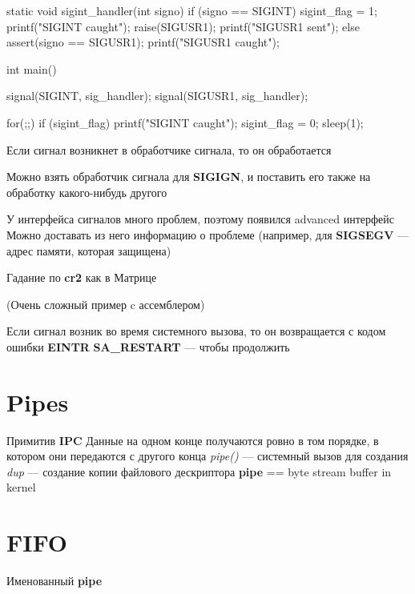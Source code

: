 static void sigint_handler(int signo) {
    if (signo == SIGINT) {
        sigint_flag = 1;
        printf("SIGINT caught\n");
        raise(SIGUSR1);
        printf("SIGUSR1 sent\n");
    } else {
        assert(signo == SIGUSR1);
        printf("SIGUSR1 caught\n");
    }
}

int main() {
    signal(SIGINT, sig_handler);
    signal(SIGUSR1, sig_handler);

    for(;;) {
        if (sigint_flag) {
            printf("SIGINT caught\n");
            sigint_flag = 0;
        }
        sleep(1);
    }
}
Если сигнал возникнет в обработчике сигнала, то он обработается

Можно взять обработчик сигнала для \textbf{SIGIGN}, и поставить его также на обработку какого-нибудь другого

У интерфейса сигналов много проблем, поэтому появился advanced интерфейс 
Можно доставать из него информацию о проблеме (например, для \textbf{SIGSEGV} --- адрес памяти, которая защищена)

Гадание по \textbf{cr2} как в Матрице


(Очень сложный пример c ассемблером)


Если сигнал возник во время системного вызова, то он возвращается с кодом ошибки \textbf{EINTR}
\textbf{SA_RESTART} --- чтобы продолжить


\section{Pipes}
Примитив \textbf{IPC}
Данные на одном конце получаются ровно в том порядке, в котором они передаются с другого конца
\emph{pipe()} --- системный вызов для создания
\emph{dup} --- создание копии файлового дескриптора
\textbf{pipe} == byte stream buffer in kernel

\section{FIFO}
Именованный \textbf{pipe}

